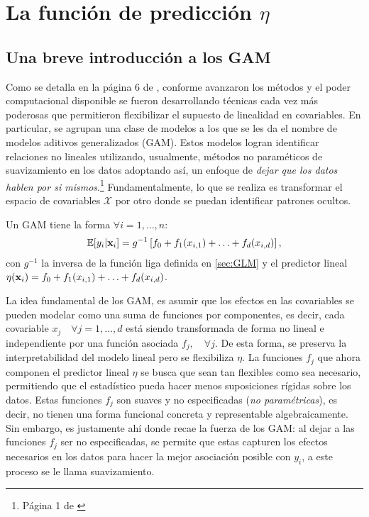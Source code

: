 \documentclass[../Main/Main.tex]{subfiles}
\begin{document}
\section{La función de predicción $\eta$} \label{sec:FuncPred} 
\subsection{Una breve introducción a los GAM}
Como se detalla en la página 6 de \citet{james2013introduction}, conforme avanzaron los métodos y el poder computacional disponible se fueron desarrollando técnicas cada vez más poderosas que permitieron flexibilizar el supuesto de linealidad en covariables. En particular, \citeauthor{hastie1990generalized} se agrupan una clase de modelos a los que se les da el nombre de modelos aditivos generalizados (GAM). Estos modelos logran identificar relaciones no lineales utilizando, usualmente, métodos no paraméticos de suavizamiento en los datos  adoptando así, un enfoque de \textit{dejar que los datos hablen por si mismos}.\footnote{Página 1 de \citet{hastie1990generalized}} Fundamentalmente, lo que se realiza es transformar el espacio de covariables $\mathcal{X}$ por otro donde se puedan identificar patrones ocultos.\\

\begin{definition} \label{def:GAM}
Un GAM tiene la forma $\forall i =1,\ldots,n$:
\begin{align}
	\mathbb{E}[y_i|\mathbf{x}_i] = g^{-1}\left[f_0 + f_1(x_{i,1}) + \ldots + f_d(x_{i,d})\right],\label{ec:GAM}
\end{align}
con $g^{-1}$ la inversa de la función liga definida en \eqref{sec:GLM} y el predictor lineal $\eta(\mathbf{x}_i) = f_0 + f_1(x_{i,1}) + \ldots + f_d(x_{i,d})$. 
\end{definition}

La idea fundamental de los GAM, es asumir que los efectos en las covariables se pueden modelar como una suma de funciones por componentes, es decir, cada covariable $x_j \quad \forall j =1,\ldots,d$ está siendo transformada de forma no lineal e independiente por una función asociada $f_j, \quad \forall j$. De esta forma, se preserva la interpretabilidad del modelo lineal pero se flexibiliza $\eta$. La funciones $f_j$ que ahora componen el predictor lineal $\eta$ se busca que sean tan flexibles como sea necesario, permitiendo que el estadístico pueda hacer menos suposiciones rígidas sobre los datos. Estas funciones $f_j$ son suaves y no especificadas (\textit{no paramétricas}), es decir, no tienen una forma funcional concreta y representable algebraicamente. Sin embargo, es justamente ahí donde recae la fuerza de los GAM: al dejar a las funciones $f_j$ ser no especificadas, se permite que estas capturen los efectos necesarios en los datos para hacer la mejor asociación posible con $y_i$, a este proceso se le llama suavizamiento. 
\end{document}
